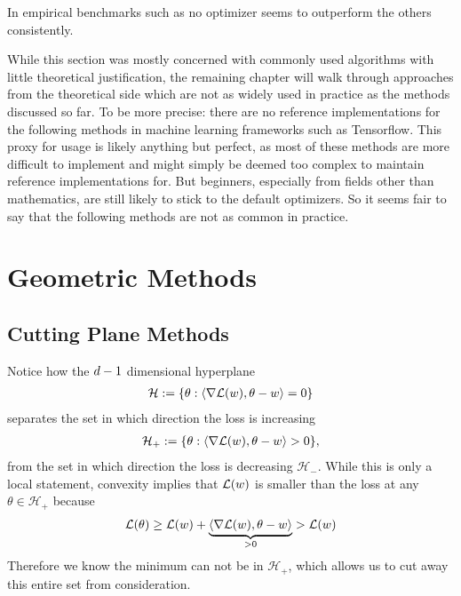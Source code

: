 In empirical benchmarks such as \textcite{schmidtDescendingCrowdedValley2021} no
optimizer seems to outperform the others consistently.

While this section was mostly concerned with commonly used algorithms with little
theoretical justification, the remaining chapter will walk through approaches
from the theoretical side which are not as widely used in practice as the
methods discussed so far. To be more precise: there are no reference implementations
for the following methods in machine learning frameworks such as Tensorflow.
This proxy for usage is likely anything but perfect, as most of these methods are
more difficult to implement and might simply be deemed too complex to maintain
reference implementations for. But beginners, especially from fields other than
mathematics, are still likely to stick to the default optimizers. So it seems
fair to say that the following methods are not as common in practice.

\section{Geometric Methods}\label{sec: geometric methods}

\subsection{Cutting Plane Methods}

Notice how the \(d-1\) dimensional hyperplane
\begin{align*}
	\mathcal{H}
	:= \{\theta : \langle \nabla\mathcal{L}(w), \theta - w \rangle = 0\}
\end{align*}
separates the set in which direction the loss is increasing
\begin{align*}
	\mathcal{H}_+
	:= \{\theta : \langle \nabla\mathcal{L}(w), \theta - w \rangle > 0\},
\end{align*}
from the set in which direction the loss is decreasing \(\mathcal{H}_-\). While
this is only a local statement, convexity implies that \(\mathcal{L}(w)\) is
smaller than the loss at any \(\theta\in\mathcal{H}_+\) because
\begin{align*}
	\mathcal{L}(\theta)
	\ge \mathcal{L}(w) + \underbrace{\langle \nabla\mathcal{L}(w), \theta -w\rangle}_{>0}
	> \mathcal{L}(w)
\end{align*}
Therefore we know the minimum can not be in \(\mathcal{H}_+\), which allows us
to cut away this entire set from consideration.

